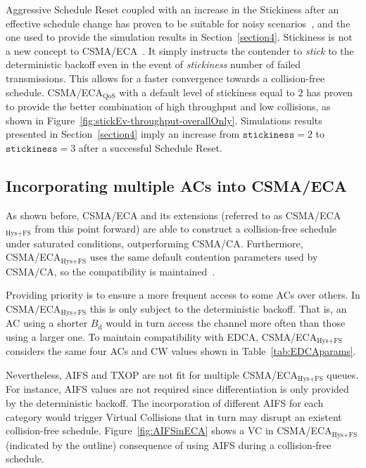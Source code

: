 Aggressive Schedule Reset coupled with an increase in the Stickiness after an effective schedule change has proven to be suitable for noisy scenarios~\cite{sanabria2014high}, and the one used to provide the simulation results in Section~\ref{section4}. Stickiness is not a new concept to CSMA/ECA~\cite{barcelo2011tcf}. It simply instructs the contender to \emph{stick} to the deterministic backoff even in the event of \emph{stickiness} number of failed transmissions. This allows for a faster convergence towards a collision-free schedule. CSMA/ECA$_{\text{QoS}}$ with a default level of stickiness equal to $2$ has proven to provide the better combination of high throughput and low collisions, as shown in Figure~\ref{fig:stickEv-throughput-overallOnly}. Simulations results presented in Section~\ref{section4} imply an increase from ${\texttt{stickiness}}=2$ to ${\texttt{stickiness}}=3$ after a successful Schedule Reset.


\subsection{Incorporating multiple ACs into CSMA/ECA}
As shown before, CSMA/ECA and its extensions (referred to as CSMA/ECA$_{\text{Hys+FS}}$ from this point forward) are able to construct a collision-free schedule under saturated conditions, outperforming CSMA/CA. Furthermore, CSMA/ECA$_{\text{Hys+FS}}$ uses the same default contention parameters used by CSMA/CA, so the compatibility is maintained~\cite{sanabria2014high}.

Providing priority is to ensure a more frequent access to some ACs over others. In CSMA/ECA$_{\text{Hys+FS}}$ this is only subject to the deterministic backoff. That is, an AC using a shorter $B_{\text{d}}$ would in turn access the channel more often than those using a larger one. To maintain compatibility with EDCA, CSMA/ECA$_{\text{Hys+FS}}$ considers the same four ACs and CW values shown in Table~\ref{tab:EDCAparams}. 

Nevertheless, AIFS and TXOP are not fit for multiple CSMA/ECA$_{\text{Hys+FS}}$ queues. For instance, AIFS values are not required since differentiation is only provided by the deterministic backoff. The incorporation of different AIFS for each category would trigger Virtual Collisions that in turn may disrupt an existent collision-free schedule. Figure~\ref{fig:AIFSinECA} shows a VC in CSMA/ECA$_{\text{Hys+FS}}$ (indicated by the outline) consequence of using AIFS during a collision-free schedule.

